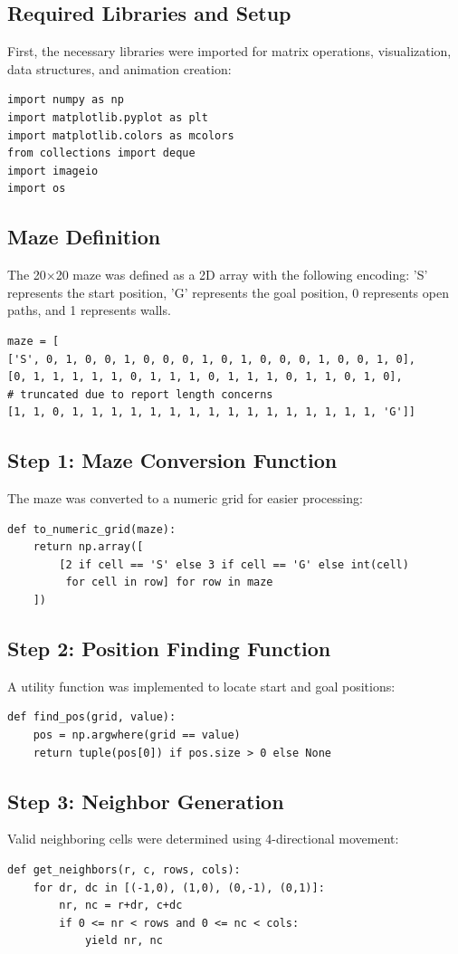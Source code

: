 \documentclass[a4paper, journal]{IEEEtran}
\begin{document}
\subsection{Required Libraries and Setup}
First, the necessary libraries were imported for matrix operations, visualization, data structures, and animation creation:
\begin{lstlisting}
import numpy as np
import matplotlib.pyplot as plt
import matplotlib.colors as mcolors
from collections import deque
import imageio
import os
\end{lstlisting}

\subsection{Maze Definition}
The 20×20 maze was defined as a 2D array with the following encoding: 'S' represents the start position, 'G' represents the goal position, 0 represents open paths, and 1 represents walls.

\begin{lstlisting}
maze = [
['S', 0, 1, 0, 0, 1, 0, 0, 0, 1, 0, 1, 0, 0, 0, 1, 0, 0, 1, 0],
[0, 1, 1, 1, 1, 1, 0, 1, 1, 1, 0, 1, 1, 1, 0, 1, 1, 0, 1, 0],
# truncated due to report length concerns
[1, 1, 0, 1, 1, 1, 1, 1, 1, 1, 1, 1, 1, 1, 1, 1, 1, 1, 1, 'G']]
\end{lstlisting}

\subsection*{Step 1: Maze Conversion Function}
The maze was converted to a numeric grid for easier processing:
\begin{lstlisting}
def to_numeric_grid(maze):
    return np.array([
        [2 if cell == 'S' else 3 if cell == 'G' else int(cell) 
         for cell in row] for row in maze
    ])
\end{lstlisting}

\subsection*{Step 2: Position Finding Function}
A utility function was implemented to locate start and goal positions:
\begin{lstlisting}
def find_pos(grid, value):
    pos = np.argwhere(grid == value)
    return tuple(pos[0]) if pos.size > 0 else None
\end{lstlisting}

\subsection*{Step 3: Neighbor Generation}
Valid neighboring cells were determined using 4-directional movement:
\begin{lstlisting}
def get_neighbors(r, c, rows, cols):
    for dr, dc in [(-1,0), (1,0), (0,-1), (0,1)]:
        nr, nc = r+dr, c+dc
        if 0 <= nr < rows and 0 <= nc < cols:
            yield nr, nc
\end{lstlisting}
\end{document}
